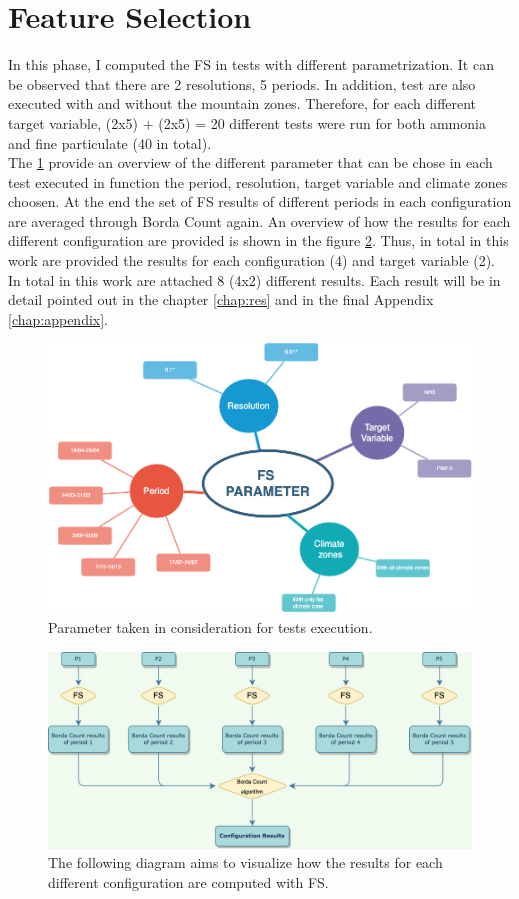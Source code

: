 \section{Feature Selection}
In this phase, I computed the FS in tests with different parametrization.
It can be observed that there are 2 resolutions, 5 periods. In addition, test are also executed with and without the mountain zones. Therefore, for each different target variable, (2x5) + (2x5) = 20 different tests were run for both ammonia and fine particulate (40 in total). \\
The \ref{fig:test_params} provide an overview of the different parameter that can be chose in each test executed in function the period, resolution, target variable and climate zones choosen.
At the end the set of FS results of different periods in each configuration are averaged through Borda Count again. An overview of how the results for each different configuration are provided is shown in the figure \ref{fig:overview_configuration}.
Thus, in total in this work are provided the results for each configuration (4) and target variable (2).
In total in this work are attached 8 (4x2) different results. Each result will be in detail pointed out in the chapter \ref{chap:res} and in the final Appendix \ref{chap:appendix}.
\begin{figure}[H]
    \centering
    \includegraphics[width=.9\textwidth]{images/test_param.png}
    \caption{Parameter taken in consideration for tests execution.}
    \label{fig:test_params}
\end{figure}
\pagebreak

\begin{figure}[H]
    \centering
    \includegraphics[width=.9\textwidth]{images/overview_results_configuration.png}
    \caption{The following diagram aims to visualize how the results for each different configuration are computed with FS.}
    \label{fig:overview_configuration}
\end{figure}


